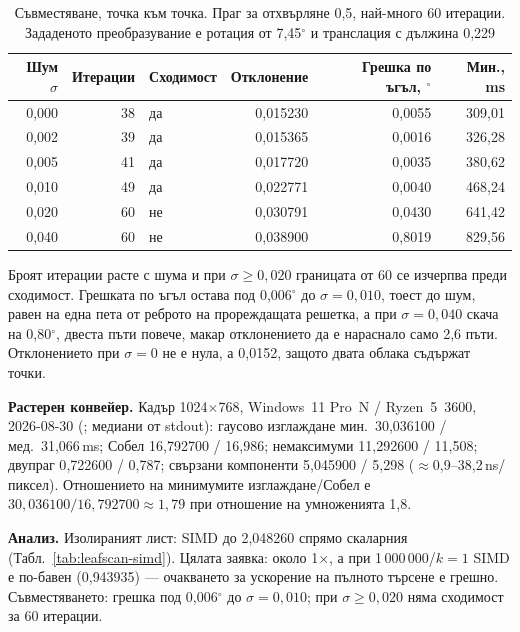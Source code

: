 \begin{table}[H]
\centering
\caption{Съвместяване, точка към точка. Праг за отхвърляне 0,5, най-много 60 итерации.
Зададеното преобразувание е ротация от 7,45$^\circ$ и транслация с дължина 0,229}
\label{tab:icp}
\begin{tabular}{@{}rrlrrr@{}}
\toprule
\textbf{Шум $\sigma$} & \textbf{Итерации} & \textbf{Сходимост} & \textbf{Отклонение} & \textbf{Грешка по ъгъл, $^\circ$} & \textbf{Мин., ms} \\
\midrule
0{,}000 & 38 & да & 0{,}015230 & 0{,}0055 & 309{,}01 \\
0{,}002 & 39 & да & 0{,}015365 & 0{,}0016 & 326{,}28 \\
0{,}005 & 41 & да & 0{,}017720 & 0{,}0035 & 380{,}62 \\
0{,}010 & 49 & да & 0{,}022771 & 0{,}0040 & 468{,}24 \\
0{,}020 & 60 & не & 0{,}030791 & 0{,}0430 & 641{,}42 \\
0{,}040 & 60 & не & 0{,}038900 & 0{,}8019 & 829{,}56 \\
\bottomrule
\end{tabular}
\end{table}

Броят итерации расте с шума и при $\sigma \ge 0{,}020$ границата от 60 се изчерпва преди
сходимост. Грешката по ъгъл остава под 0,006$^\circ$ до $\sigma = 0{,}010$, тоест до шум, равен
на една пета от реброто на прореждащата решетка, а при $\sigma = 0{,}040$ скача на 0,80$^\circ$,
двеста пъти повече, макар отклонението да е нараснало само 2,6 пъти. Отклонението при
$\sigma = 0$ не е нула, а 0,0152, защото двата облака съдържат  точки.

\textbf{Растерен конвейер.} Кадър 1024$\times$768, Windows~11 Pro~N / Ryzen~5~3600,
2026-08-30 (; медиани от stdout): гаусово изглаждане
мин.\ 30{,}036100 / мед.\ 31{,}066\,ms; Собел 16{,}792700 / 16{,}986; немаксимуми
11{,}292600 / 11{,}508; двупраг 0{,}722600 / 0{,}787; свързани компоненти 5{,}045900 / 5{,}298
($\approx$0{,}9--38{,}2\,ns/пиксел). Отношението на минимумите изглаждане/Собел е
$30{,}036100/16{,}792700\approx 1{,}79$ при отношение на умноженията 1,8.

\textbf{Анализ.} Изолираният лист: SIMD до 2{,}048260 спрямо скаларния
(Табл.~\ref{tab:leafscan-simd}). Цялата заявка: около 1$\times$, а при 1\,000\,000/$k{=}1$
SIMD е по-бавен (0{,}943935) --- очакването за ускорение на пълното търсене е грешно.
Съвместяването: грешка под 0,006$^\circ$ до $\sigma{=}0{,}010$; при $\sigma\ge 0{,}020$ няма
сходимост за 60 итерации.
